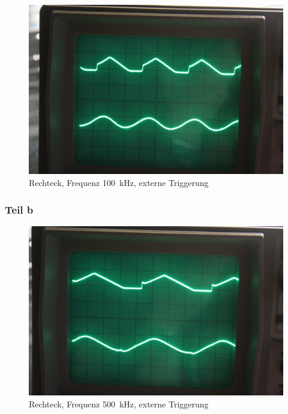 \begin{figure}
	\centering
	\begin{minipage}{.45\linewidth}
	\end{minipage}
	\hfill
	\begin{minipage}{.45\linewidth}
	\includegraphics[width=\linewidth]{Fotos/IMG_0778-1500.jpg}
	\end{minipage}
	\caption{%
		Rechteck, Frequenz \SI{100}{\kilo\hertz},
		externe Triggerung
	}
	\label{fig:0778}
\end{figure}

\subsubsection{Teil b}

\begin{figure}
	\centering
	\begin{minipage}{.45\linewidth}
	\end{minipage}
	\hfill
	\begin{minipage}{.45\linewidth}
	\includegraphics[width=\linewidth]{Fotos/IMG_0779-1500.jpg}
	\end{minipage}
	\caption{%
		Rechteck, Frequenz \SI{500}{\kilo\hertz},
		externe Triggerung
	}
	\label{fig:0779}
\end{figure}

